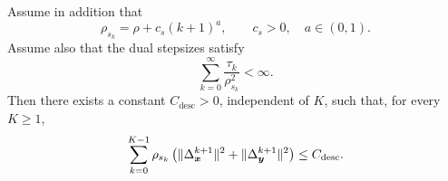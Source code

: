 \begin{proposition}
\label{lem:weighted-finite-length}
Assume in addition that
\[
    \rho_{s_k}=\rho+c_s(k+1)^a,
    \qquad
    c_s>0,\quad a\in(0,1).
\]
Assume also that the dual stepsizes satisfy
\begin{equation}
    \sum_{k=0}^{\infty}
    \frac{\tau_k}{\rho_{s_k}^2}
    <\infty.
    \label{eq:dual-ascent-summability}
\end{equation}
Then there exists a constant $C_{\mathrm{desc}}>0$, independent of $K$,
such that, for every $K\ge1$,
\begin{equation}\label{eq:weighted-finite-length}
    \sum_{k=0}^{K-1}
    \rho_{s_k}\left(\|\Delta_{\bm{x}}^{k+1}\|^2+\|\Delta_{\bm{y}}^{k+1}\|^2\right)
    \le
    C_{\mathrm{desc}} .
\end{equation}
\end{proposition}

